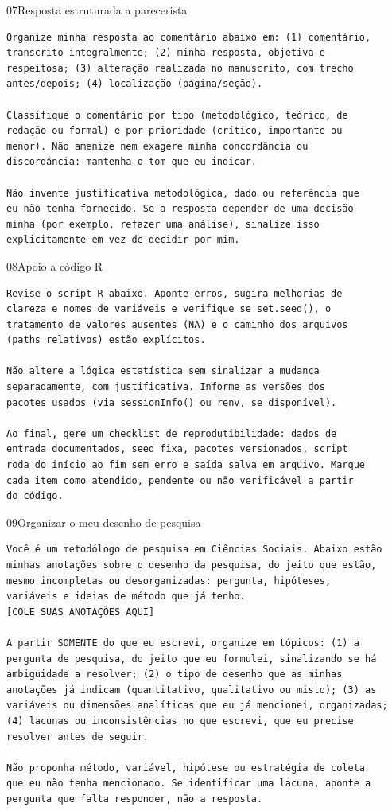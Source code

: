 \documentclass[11pt,a4paper]{article}
\begin{document}
\begin{modelo}{07}{Resposta estruturada a parecerista}
\begin{lstlisting}
Organize minha resposta ao comentário abaixo em: (1) comentário,
transcrito integralmente; (2) minha resposta, objetiva e
respeitosa; (3) alteração realizada no manuscrito, com trecho
antes/depois; (4) localização (página/seção).

Classifique o comentário por tipo (metodológico, teórico, de
redação ou formal) e por prioridade (crítico, importante ou
menor). Não amenize nem exagere minha concordância ou
discordância: mantenha o tom que eu indicar.

Não invente justificativa metodológica, dado ou referência que
eu não tenha fornecido. Se a resposta depender de uma decisão
minha (por exemplo, refazer uma análise), sinalize isso
explicitamente em vez de decidir por mim.
\end{lstlisting}
\end{modelo}

\begin{modelo}{08}{Apoio a código R}
\begin{lstlisting}
Revise o script R abaixo. Aponte erros, sugira melhorias de
clareza e nomes de variáveis e verifique se set.seed(), o
tratamento de valores ausentes (NA) e o caminho dos arquivos
(paths relativos) estão explícitos.

Não altere a lógica estatística sem sinalizar a mudança
separadamente, com justificativa. Informe as versões dos
pacotes usados (via sessionInfo() ou renv, se disponível).

Ao final, gere um checklist de reprodutibilidade: dados de
entrada documentados, seed fixa, pacotes versionados, script
roda do início ao fim sem erro e saída salva em arquivo. Marque
cada item como atendido, pendente ou não verificável a partir
do código.
\end{lstlisting}
\end{modelo}

\begin{modelo}{09}{Organizar o meu desenho de pesquisa}
\begin{lstlisting}
Você é um metodólogo de pesquisa em Ciências Sociais. Abaixo estão
minhas anotações sobre o desenho da pesquisa, do jeito que estão,
mesmo incompletas ou desorganizadas: pergunta, hipóteses,
variáveis e ideias de método que já tenho.
[COLE SUAS ANOTAÇÕES AQUI]

A partir SOMENTE do que eu escrevi, organize em tópicos: (1) a
pergunta de pesquisa, do jeito que eu formulei, sinalizando se há
ambiguidade a resolver; (2) o tipo de desenho que as minhas
anotações já indicam (quantitativo, qualitativo ou misto); (3) as
variáveis ou dimensões analíticas que eu já mencionei, organizadas;
(4) lacunas ou inconsistências no que escrevi, que eu precise
resolver antes de seguir.

Não proponha método, variável, hipótese ou estratégia de coleta
que eu não tenha mencionado. Se identificar uma lacuna, aponte a
pergunta que falta responder, não a resposta.
\end{lstlisting}
\end{modelo}
\end{document}
